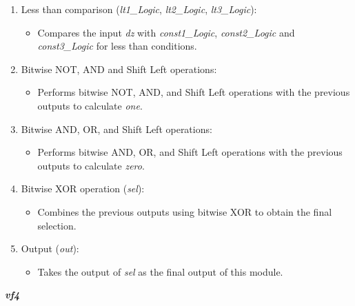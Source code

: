 \begin{enumerate}

\item Less than comparison (\textit{lt1\_Logic}, \textit{lt2\_Logic}, \textit{lt3\_Logic}):
\begin{itemize}
\item Compares the input \textit{dz} with \textit{const1\_Logic}, \textit{const2\_Logic} and \textit{const3\_Logic} for less than conditions.
\end{itemize}

\item Bitwise NOT, AND and Shift Left operations:
\begin{itemize}
\item Performs bitwise NOT, AND, and Shift Left operations with the previous outputs to calculate \textit{one}.
\end{itemize}

\item Bitwise AND, OR, and Shift Left operations:
\begin{itemize}
\item Performs bitwise AND, OR, and Shift Left operations with the previous outputs to calculate \textit{zero}.
\end{itemize}

\item Bitwise XOR operation (\textit{sel}):
\begin{itemize}
\item Combines the previous outputs using bitwise XOR to obtain the final selection.
\end{itemize}

\item Output (\textit{out}):
\begin{itemize}
\item Takes the output of \textit{sel} as the final output of this module.
\end{itemize}

\end{enumerate}

\vspace{0.5cm}

\textbf{\textit{vf4}}

